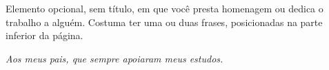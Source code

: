 \begin{dedicatoria}
\begin{instrucao}
Elemento opcional, sem título, em que você presta homenagem ou dedica o
trabalho a alguém. Costuma ter uma ou duas frases, posicionadas na parte
inferior da página.
\end{instrucao}
\vspace*{\fill}
\begin{flushright}
  \begin{minipage}{.5\textwidth}
    \raggedleft\itshape
    Aos meus pais, que sempre apoiaram meus estudos.
  \end{minipage}
\end{flushright}
\end{dedicatoria}
